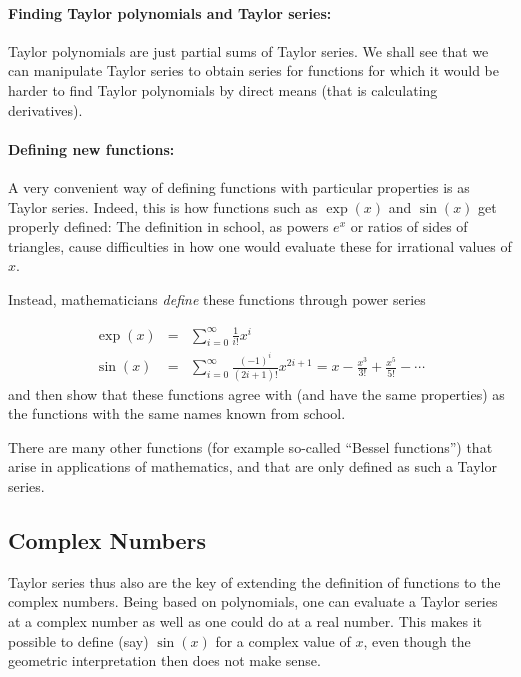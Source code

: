 \paragraph{Finding Taylor polynomials and Taylor series:} Taylor polynomials are just partial
sums of Taylor series. We shall see that we can manipulate Taylor series to
obtain series for functions for which it would be harder to find Taylor
polynomials by direct means (that is calculating derivatives).

\paragraph{Defining new functions:} A very convenient way of defining
functions with particular properties is as Taylor series. Indeed, this is
how functions such as $\exp(x)$ and $\sin(x)$ get properly defined: The
definition in school, as powers $e^x$ or ratios of sides of triangles, cause
difficulties
in how one would evaluate these for irrational values of $x$.

Instead, mathematicians {\em define} these functions through power series

\begin{eqnarray*}
\exp(x)&=&\sum_{i=0}^\infty\frac{1}{i!} x^i\\
\sin(x)&=&\sum_{i=0}^\infty
\frac{(-1)^i}{(2i+1)!}x^{2i+1}=x-\frac{x^3}{3!}+\frac{x^5}{5!}-\cdots
\end{eqnarray*}
and then show that these functions agree with (and have the same properties)
as the functions with the same names known from school.
\smallskip

There are many other functions (for example so-called ``Bessel functions'')
that arise in applications of mathematics, and that are only defined as such
a Taylor series.

\subsection{Complex Numbers}

Taylor series thus also are the key of extending the definition of functions to
the complex numbers. Being based on polynomials, one can evaluate a Taylor
series at a complex number as well as one could do at a real number. This
makes it possible to define (say) $\sin(x)$ for a complex value of $x$, even
though the geometric interpretation then does not make sense.

